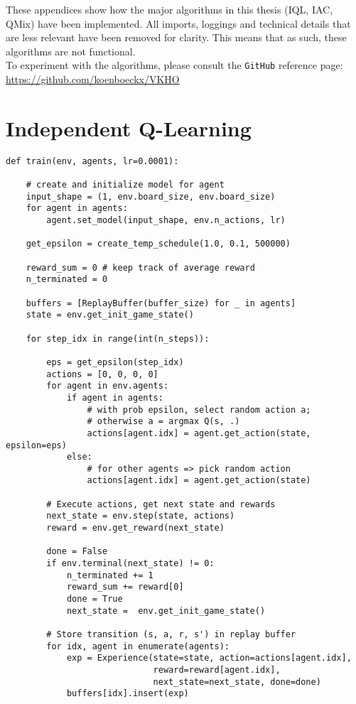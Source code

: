 \begin{appendices}
These appendices show how the major algorithms in this thesis (IQL, IAC, QMix) have been implemented. All imports, loggings and technical details that are less relevant have been removed for clarity. This means that as such, these algorithms are not functional.\\ To experiment with the algorithms, please consult the {\tt GitHub} reference page:\\ \url{https://github.com/koenboeckx/VKHO}

\chapter{Independent Q-Learning}
\label{app:iql}

\begin{verbatim}
def train(env, agents, lr=0.0001):
    
    # create and initialize model for agent
    input_shape = (1, env.board_size, env.board_size)
    for agent in agents:
        agent.set_model(input_shape, env.n_actions, lr)

    get_epsilon = create_temp_schedule(1.0, 0.1, 500000)

    reward_sum = 0 # keep track of average reward
    n_terminated = 0

    buffers = [ReplayBuffer(buffer_size) for _ in agents]
    state = env.get_init_game_state()
    
    for step_idx in range(int(n_steps)):
        
        eps = get_epsilon(step_idx)
        actions = [0, 0, 0, 0]
        for agent in env.agents:
            if agent in agents:
                # with prob epsilon, select random action a;
                # otherwise a = argmax Q(s, .)
                actions[agent.idx] = agent.get_action(state, epsilon=eps)
            else:
                # for other agents => pick random action
                actions[agent.idx] = agent.get_action(state)
        
        # Execute actions, get next state and rewards
        next_state = env.step(state, actions)
        reward = env.get_reward(next_state)

        done = False
        if env.terminal(next_state) != 0:
            n_terminated += 1
            reward_sum += reward[0]
            done = True
            next_state =  env.get_init_game_state()

        # Store transition (s, a, r, s') in replay buffer
        for idx, agent in enumerate(agents):
            exp = Experience(state=state, action=actions[agent.idx],
                             reward=reward[agent.idx],
                             next_state=next_state, done=done)
            buffers[idx].insert(exp)


\end{verbatim}
\end{appendices}
